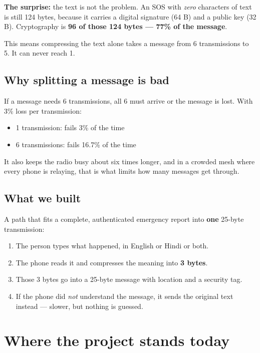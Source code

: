 \documentclass[11pt,a4paper]{article}
\begin{document}
\textbf{The surprise:} the text is not the problem. An SOS with \emph{zero}
characters of text is still 124 bytes, because it carries a digital signature
(64 B) and a public key (32 B). Cryptography is \textbf{96 of those 124 bytes
--- 77\% of the message}.

This means compressing the text alone takes a message from 6 transmissions to
5. It can never reach 1.

\subsection{Why splitting a message is bad}

If a message needs 6 transmissions, all 6 must arrive or the message is lost.
With 3\% loss per transmission:

\begin{itemize}
\item 1 transmission: fails 3\% of the time
\item 6 transmissions: fails 16.7\% of the time
\end{itemize}

It also keeps the radio busy about six times longer, and in a crowded mesh
where every phone is relaying, that is what limits how many messages get
through.

\subsection{What we built}

A path that fits a complete, authenticated emergency report into
\textbf{one} 25-byte transmission:

\begin{enumerate}
\item The person types what happened, in English or Hindi or both.
\item The phone reads it and compresses the meaning into \textbf{3 bytes}.
\item Those 3 bytes go into a 25-byte message with location and a security tag.
\item If the phone did \emph{not} understand the message, it sends the original
      text instead --- slower, but nothing is guessed.
\end{enumerate}

\section{Where the project stands today}
\end{document}
